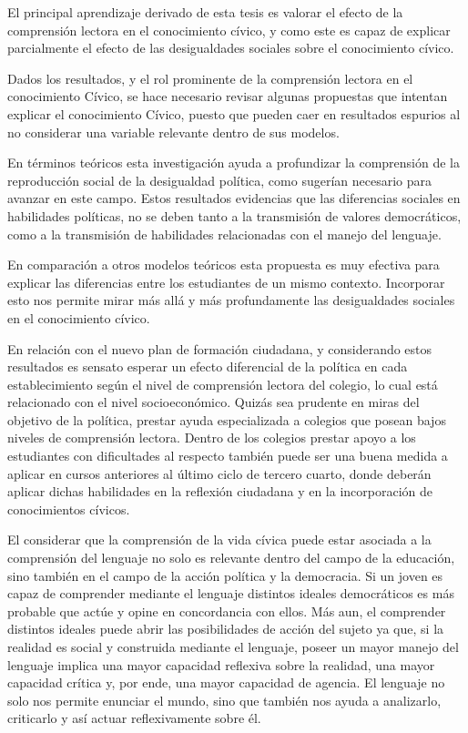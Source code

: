 \documentclass[12pt,twoside]{templates/facsothesis}
\begin{document}
El principal aprendizaje derivado de esta tesis es valorar el efecto de la comprensión lectora en el conocimiento cívico, y como este es capaz de explicar parcialmente el efecto de las desigualdades sociales sobre el conocimiento cívico.

Dados los resultados, y el rol prominente de la comprensión lectora en el conocimiento Cívico, se hace necesario revisar algunas propuestas que intentan explicar el conocimiento Cívico, puesto que pueden caer en resultados espurios al no considerar una variable relevante dentro de sus modelos.

En términos teóricos esta investigación ayuda a profundizar la comprensión de la reproducción social de la desigualdad política, como \citet{brady_Political_2015} sugerían necesario para avanzar en este campo. Estos resultados evidencias que las diferencias sociales en habilidades políticas, no se deben tanto a la transmisión de valores democráticos, como a la transmisión de habilidades relacionadas con el manejo del lenguaje.

En comparación a otros modelos teóricos esta propuesta es muy efectiva para explicar las diferencias entre los estudiantes de un mismo contexto. Incorporar esto nos permite mirar más allá y más profundamente las desigualdades sociales en el conocimiento cívico.

En relación con el nuevo plan de formación ciudadana, y considerando estos resultados es sensato esperar un efecto diferencial de la política en cada establecimiento según el nivel de comprensión lectora del colegio, lo cual está relacionado con el nivel socioeconómico. Quizás sea prudente en miras del objetivo de la política, prestar ayuda especializada a colegios que posean bajos niveles de comprensión lectora. Dentro de los colegios prestar apoyo a los estudiantes con dificultades al respecto también puede ser una buena medida a aplicar en cursos anteriores al último ciclo de tercero cuarto, donde deberán aplicar dichas habilidades en la reflexión ciudadana y en la incorporación de conocimientos cívicos.

El considerar que la comprensión de la vida cívica puede estar asociada a la comprensión del lenguaje no solo es relevante dentro del campo de la educación, sino también en el campo de la acción política y la democracia. Si un joven es capaz de comprender mediante el lenguaje distintos ideales democráticos es más probable que actúe y opine en concordancia con ellos. Más aun, el comprender distintos ideales puede abrir las posibilidades de acción del sujeto ya que, si la realidad es social y construida mediante el lenguaje, poseer un mayor manejo del lenguaje implica una mayor capacidad reflexiva sobre la realidad, una mayor capacidad crítica y, por ende, una mayor capacidad de agencia. El lenguaje no solo nos permite enunciar el mundo, sino que también nos ayuda a analizarlo, criticarlo y así actuar reflexivamente sobre él.
\end{document}
